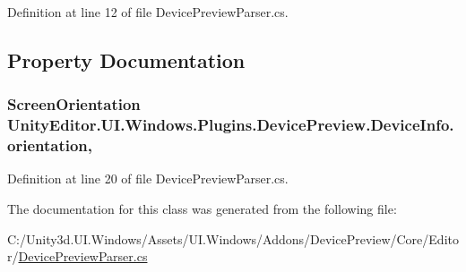 Definition at line 12 of file Device\+Preview\+Parser.\+cs.



\subsection{Property Documentation}
\hypertarget{class_unity_editor_1_1_u_i_1_1_windows_1_1_plugins_1_1_device_preview_1_1_device_info_a9654c31257056bb50c4b5fafd0d513f4}{}
\subsubsection[{orientation}]{\setlength{\rightskip}{0pt plus 5cm}Screen\+Orientation Unity\+Editor.\+U\+I.\+Windows.\+Plugins.\+Device\+Preview.\+Device\+Info.\+orientation\hspace{0.3cm}{\ttfamily [get]}, {\ttfamily [set]}}\label{class_unity_editor_1_1_u_i_1_1_windows_1_1_plugins_1_1_device_preview_1_1_device_info_a9654c31257056bb50c4b5fafd0d513f4}


Definition at line 20 of file Device\+Preview\+Parser.\+cs.



The documentation for this class was generated from the following file\+:\begin{DoxyCompactItemize}
\item 
C\+:/\+Unity3d.\+U\+I.\+Windows/\+Assets/\+U\+I.\+Windows/\+Addons/\+Device\+Preview/\+Core/\+Editor/\hyperlink{_device_preview_parser_8cs}{Device\+Preview\+Parser.\+cs}\end{DoxyCompactItemize}
